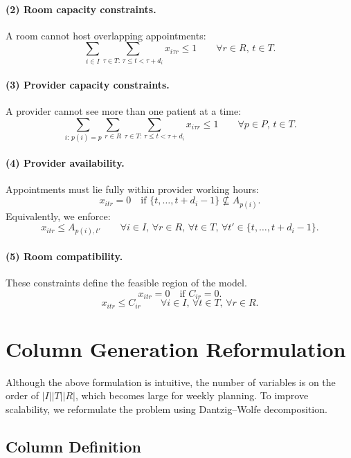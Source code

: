 \documentclass[12pt]{article}
\begin{document}
\paragraph{(2) Room capacity constraints.}
A room cannot host overlapping appointments:
\[
  \sum_{i \in I} \sum_{\tau \in T:\, \tau \le t < \tau + d_i} x_{i\tau r} \le 1
  \qquad \forall r \in R,\, t \in T.
\]

\paragraph{(3) Provider capacity constraints.}
A provider cannot see more than one patient at a time:
\[
  \sum_{i:\, p(i)=p} \sum_{r \in R} \sum_{\tau \in T:\, \tau \le t < \tau + d_i} x_{i\tau r} \le 1
  \qquad \forall p \in P,\, t \in T.
\]

\paragraph{(4) Provider availability.}
Appointments must lie fully within provider working hours:
\[
  x_{itr} = 0 \quad \text{if } \{t, \ldots, t + d_i - 1\} \not\subseteq A_{p(i)}.
\]
Equivalently, we enforce:
\[
  x_{itr} \le A_{p(i),t'} \qquad \forall i \in I,\, \forall r \in R,\, \forall t \in T,\, \forall t' \in \{t, \ldots, t + d_i - 1\}.
\]

\paragraph{(5) Room compatibility.}
These constraints define the feasible region of the model.
\[
  x_{itr} = 0 \quad \text{if } C_{ir} = 0.
\]
\[
  x_{itr} \le C_{ir} \qquad \forall i \in I,\, \forall t \in T,\, \forall r \in R.
\]

\section{Column Generation Reformulation}

Although the above formulation is intuitive, the number of variables is on the order of
$|I||T||R|$, which becomes large for weekly planning. To improve scalability, we reformulate
the problem using Dantzig--Wolfe decomposition.

\subsection*{Column Definition}
\end{document}

